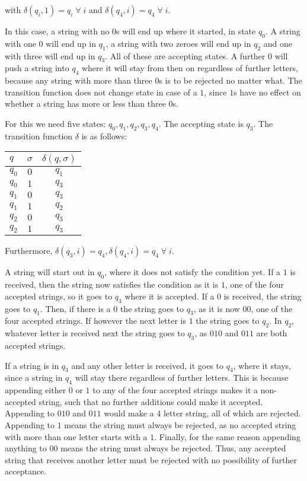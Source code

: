 with $\delta(q_i, 1) = q_i \;\forall\; i$ and $\delta(q_4, i) = q_4 \;\forall\; i$.

In this case, a string with no $0$s will end up where it started, in state $q_0$. A string with one $0$ will end up in $q_1$, a string with two zeroes will end up in $q_2$ and one with three will end up in $q_3$. All of these are accepting states. A further $0$ will push a string into $q_4$ where it will stay from then on regardless of further letters, because any string with more than three $0$s is to be rejected no matter what. The transition function does not change state in case of a $1$, since $1$s have no effect on whether a string has more or less than three $0$s.

For this we need five states: $q_0, q_1, q_2, q_3, q_4$. The accepting state is $q_3$. The transition function $\delta$ is as follows:
\begin{center}
\begin{tabular}{lcc}
$q$ & $\sigma$ & $\delta(q, \sigma)$ \\ \hline
$q_0$ & $0$ & $q_1$ \\
$q_0$ & $1$ & $q_3$ \\
$q_1$ & $0$ & $q_3$ \\
$q_1$ & $1$ & $q_2$ \\
$q_2$ & $0$ & $q_3$ \\
$q_2$ & $1$ & $q_3$ \\
\end{tabular}
\end{center}

Furthermore, $\delta(q_3, i) = q_4, \delta(q_4, i) = q_4 \;\forall\; i$.

A string will start out in $q_0$, where it does not satisfy the condition yet. If a $1$ is received, then the string now satisfies the condition as it is $1$, one of the four accepted strings, so it goes to $q_3$ where it is accepted. If a $0$ is received, the string goes to $q_1$. Then, if there is a $0$ the string goes to $q_3$, as it is now $00$, one of the four accepted strings. If however the next letter is $1$ the string goes to $q_2$. In $q_2$, whatever letter is received next the string goes to $q_3$, as $010$ and $011$ are both accepted strings.

If a string is in $q_3$ and any other letter is received, it goes to $q_4$, where it stays, since a string in $q_4$ will stay there regardless of further letters. This is because appending either $0$ or $1$ to any of the four accepted strings makes it a non-accepted string, such that no further additions could make it accepted. Appending to $010$ and $011$ would make a 4 letter string, all of which are rejected. Appending to $1$ means the string must always be rejected, as no accepted string with more than one letter starts with a $1$. Finally, for the same reason appending anything to $00$ means the string must always be rejected. Thus, any accepted string that receives another letter must be rejected with no possibility of further acceptance.

